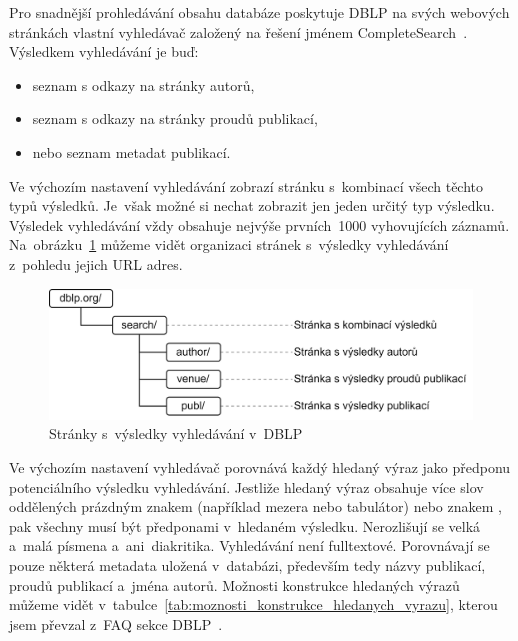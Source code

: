 \documentclass[
  biblatex,
  sourcecodes,
  glossaries,
  index
]{kidiplom}
\begin{document}
Pro snadnější prohledávání obsahu databáze poskytuje DBLP na svých webových stránkách vlastní vyhledávač založený na řešení jménem CompleteSearch~\cite{t08}. Výsledkem vyhledávání je buď:
\begin{itemize}
\item seznam s odkazy na stránky autorů,
\item seznam s odkazy na stránky proudů publikací,
\item nebo seznam metadat publikací.
\end{itemize}

Ve výchozím nastavení vyhledávání zobrazí stránku s~kombinací všech těchto typů výsledků. Je~však možné si nechat zobrazit jen jeden určitý typ výsledku. Výsledek vyhledávání vždy obsahuje nejvýše prvních~1000 vyhovujících záznamů. Na~obrázku~\ref{fig:struktura_url_adres_vyhledavani_dblp} můžeme vidět organizaci stránek s~výsledky vyhledávání z~pohledu jejich URL adres.

\begin{figure}[H]
\begin{center}
\includegraphics[width=12cm]{vyhledavani_dblp_urls}
\caption{Stránky s~výsledky vyhledávání v~DBLP}\label{fig:struktura_url_adres_vyhledavani_dblp}
\end{center}
\end{figure}

Ve výchozím nastavení vyhledávač porovnává každý hledaný výraz jako předponu potenciálního výsledku vyhledávání. Jestliže hledaný výraz obsahuje více slov oddělených prázdným znakem (například mezera nebo tabulátor) nebo znakem \uv{+}, pak všechny musí být předponami v~hledaném výsledku. Nerozlišují se velká a~malá písmena a~ani~diakritika. Vyhledávání není fulltextové. Porovnávají se pouze některá metadata uložená v~databázi, především tedy názvy publikací, proudů publikací a~jména autorů. Možnosti konstrukce hledaných výrazů můžeme vidět v~tabulce~\ref{tab:moznosti_konstrukce_hledanych_vyrazu}, kterou jsem převzal z~FAQ sekce DBLP~\cite{t09}.
\end{document}
